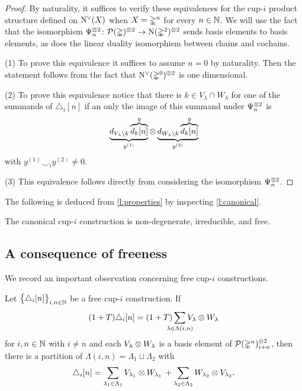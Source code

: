 \begin{proof}
	By naturality, it suffices to verify these equivalences for the \mbox{cup-$i$} product structure defined on $\operatorname{N^{\vee}}(X)$ when $X = \mathbb{\Delta}^n$ for every $n \in \mathbb{N}$.
	We will use the fact that the isomorphism $\Psi_n^{\otimes 2} \colon \mathcal{P}(\mathbb{\Delta})^{\otimes 2} \to \operatorname{N}(\mathbb{\Delta}^2)^{\otimes 2}$ sends basis elements to basis elements, as does the linear duality isomorphism between chains and cochains.

	\noindent (1) To prove this equivalence it suffices to assume $n = 0$ by naturality.
	Then the statement follows from the fact that $\operatorname{N^{\vee}}(\mathbb{\Delta}^0)^{\otimes 2}$ is one dimensional.

	\noindent (2) To prove this equivalence notice that there is $k \in V_\lambda \cap W_\lambda$ for one of the summands of $\triangle_i [n]$ if an only the image of this summand under $\Psi_n^{\otimes 2}$ is
	\[
	\underbrace{d_{V_\lambda \setminus k} \overbrace{d_k[n]}^{y}}_{y^{(1)}}
	\otimes
	\underbrace{d_{W_\lambda \setminus k} \overbrace{d_k[n]}^{y}}_{y^{(2)}}
	\]
	with $y^{(1)} \smallsmile_i y^{(2)} \neq 0$.

	\noindent (3) This equivalence follows directly from considering the isomorphism $\Psi_n^{\otimes 2}$.
\end{proof}

The following is deduced from \cref{l:properties} by inspecting \cref{l:canonical}.

\begin{theorem} \label{t:existence}
	The canonical \mbox{cup-$i$} construction is non-degenerate, irreducible, and free.
\end{theorem}

\subsection{A consequence of freeness} \label{ss:consequence}

We record an important observation concerning free cup-$i$ constructions.

\begin{lemma} \label{l:consequence}
	Let $\big\{ \triangle_i [n] \big\}_{i,n\in\mathbb{N}}$ be a free \mbox{cup-$i$} construction.
	If
	\[
	(1+T) \triangle_i [n] =
	(1+T) \sum_{\mathclap{\lambda \in \Lambda(i,n)}} V_\lambda \ot W_\lambda
	\]
	for $i,n \in \mathbb{N}$ with $i \neq n$ and each $V_\lambda \otimes W_\lambda$ is a basis element of $\mathcal{P}(\mathbb{\Delta}^n)^{\otimes 2}_{i+n}$, then there is a partition of $\Lambda(i,n) = \Lambda_1 \sqcup \Lambda_2$ with
	\begin{equation} \label{e:splitting}
	\triangle_i [n] =
	\sum_{\lambda_1 \in \Lambda_1} V_{\lambda_1} \otimes W_{\lambda_1} \, +
	\sum_{\lambda_2 \in \Lambda_2} W_{\lambda_2} \otimes V_{\lambda_2}.
	\end{equation}
\end{lemma}

